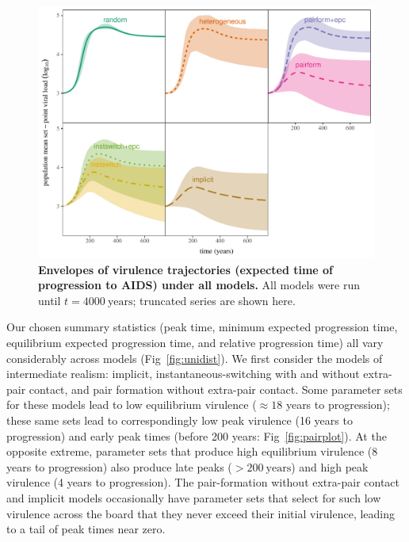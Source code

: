 \documentclass[10pt,letterpaper]{article}
\renewcommand{\figurename}{Fig}
\begin{document}
\begin{figure}[!ht]
\includegraphics[width=\textwidth]{../figures/fig2.pdf}
\caption{{\bf Envelopes of virulence trajectories (expected
time of progression to AIDS) under all models.}
All models were run until $t=4000~\textrm{years}$; truncated series are shown here.}
\label{fig:virtraj}
\end{figure}

Our chosen summary statistics (peak time, minimum expected progression time, equilibrium expected
progression time, and relative progression time) all vary considerably across models
(\figurename~\ref{fig:unidist}).
We first consider the models of intermediate realism: implicit,
instantaneous-switching with and without extra-pair contact, and
pair formation without extra-pair contact. Some parameter
sets for these models lead to low equilibrium virulence ($\approx 18$ years
to progression);
these same sets lead to correspondingly low
peak virulence (16 years to progression) and early peak times (before 200 years: \figurename~\ref{fig:pairplot}).
At the opposite extreme, parameter sets that produce high equilibrium virulence (8 years to progression)
also produce late peaks ($> 200~\text{years}$) and
high peak virulence (4 years to progression).
The pair-formation without extra-pair contact and implicit models
occasionally have parameter sets that select for such low virulence across
the board that they never exceed their initial virulence, leading to a tail
of peak times near zero.
\end{document}

